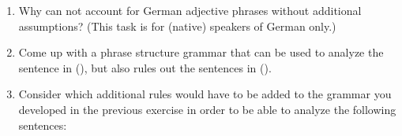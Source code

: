 \begin{enumerate}
\item Why can \xbart not account for German adjective phrases without additional assumptions? (This
  task is for (native) speakers of German only.)

\item Come up with a phrase structure grammar that can be used to analyze the sentence in (), but also
rules out the sentences in ().

      \eal
      \zl%
      \eal
      \zl
\item Consider which additional rules would have to be added to the grammar you developed in the previous exercise
	  in order to be able to analyze the following sentences:


\end{enumerate}
